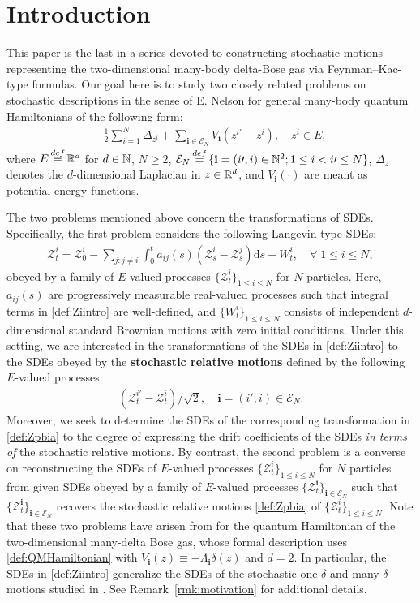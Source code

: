 \documentclass[12pt, twoside]{article}
\numberwithin{figure}{section}
\newcommand{\1}{\mathds 1}
\newcommand{\mc}{\mathcal}
\renewcommand{\d}{{\mathrm d}}
\newcommand{\R}{{\Bbb R}}
\newcommand{\2}{{\mathbf 1}}
\newcommand{\defeq}{{\stackrel{\rm def}{=}}}
\newcommand{\bi}{\mathbf i}
\newcommand{\two}{{\sqrt{2}}}
\begin{document}
\section{Introduction}\label{sec:intro}
This paper is the last in a series devoted to constructing stochastic motions representing the two-dimensional many-body delta-Bose gas via Feynman--Kac-type formulas. Our goal here is to study two closely related problems on stochastic descriptions in the sense of E. Nelson \cite{Nelson-4} for general many-body quantum Hamiltonians of the following form:
\begin{align}\label{def:QMHamiltonian}
-\frac{1}{2}\sum_{i=1}^N\Delta_{z^i}+\sum_{\bi\in \mathcal E_N} V_\bi(z^{i\prime}-z^i),\quad z^i\in E,
\end{align}
where $E\,\defeq\, \R^d$ for $d\in \Bbb N$, $N\geq 2$, $\mathcal E_N\,\defeq\,\{\bi=(i\prime,i)\in \Bbb N^2;1\leq i<i\prime\leq N\}$, $\Delta_z$ denotes the $d$-dimensional Laplacian in $z\in \R^d$, and $V_\bi(\cdot)$ are meant as potential energy functions. 

The two problems mentioned above concern the transformations of SDEs. Specifically, the first problem considers the following Langevin-type SDEs:
\begin{align}\label{def:Ziintro}
\mc Z^i_t=\mc Z^i_0-\sum_{j:j\neq i}\int_0^t a_{i j}(s)(\mc Z^i_s-\mc Z^j_s)\d s+W^i_t,\quad \forall\;1\leq i\leq N,
\end{align}
obeyed by a family of $E$-valued processes $\{\mathcal Z^i_t\}_{1\leq i\leq N}$ for $N$ particles. 
Here, $a_{ij}(s)$ are progressively measurable real-valued processes such that integral terms in \eqref{def:Ziintro} are well-defined, and $\{W^i_t\}_{1\leq i\leq N}$ consists of independent $d$-dimensional standard Brownian motions with zero initial conditions. Under this setting, we are interested in the transformations of the SDEs in \eqref{def:Ziintro} to the SDEs obeyed by the {\bf stochastic relative motions} defined by the following $E$-valued processes:
 \begin{align}\label{def:Zpbia}
 (\mathcal Z^{i\prime}_t-\mathcal Z^i_t)/\two,\quad \bi=(i\prime,i)\in \mc E_N.
 \end{align}
Moreover, we seek to determine the SDEs of the corresponding transformation in \eqref{def:Zpbia}
to the degree of expressing the drift coefficients of the SDEs \emph{in terms of} the stochastic relative motions. 
By contrast, the second problem is a converse on reconstructing the SDEs of $E$-valued processes $\{\mathcal Z^i_t\}_{1\leq i\leq N}$ for $N$ particles from given SDEs obeyed by a family of $E$-valued processes $\{\mathcal Z^\bi_t\}_{\bi\in \mc E_N}$ such that $\{\mathcal Z^\bi_t\}_{\bi\in \mc E_N}$ recovers the stochastic relative motions \eqref{def:Zpbia} of $\{\mathcal Z^i_t\}_{1\leq i\leq N}$. Note that these two problems have arisen from \cite{C:SDBG1-4,C:SDBG2-4} for the quantum Hamiltonian of the two-dimensional many-delta Bose gas, whose formal description uses \eqref{def:QMHamiltonian} with $V_\bi(z)\equiv -\Lambda_\bi\delta(z)$ and $d=2$. In particular, the SDEs in \eqref{def:Ziintro} generalize the SDEs of the stochastic one-$\delta$ and many-$\delta$ motions studied in \cite{C:SDBG1-4,C:SDBG2-4}. See Remark~\ref{rmk:motivation} for additional details. 
\end{document}
